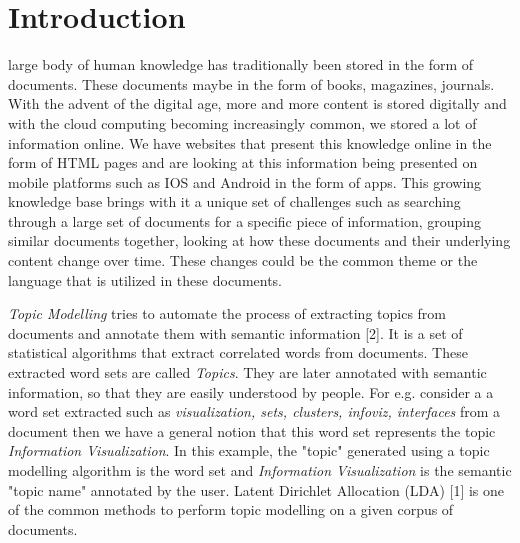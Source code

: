 \documentclass[10pt,journal,compsoc]{IEEEtran}
\begin{document}
\ifCLASSOPTIONcompsoc
{}
\else
\section{Introduction}
\label{sec:introduction}
\fi

 large body of human knowledge has traditionally been stored in the form of documents. These documents maybe in the form of books, magazines, journals. With the advent of the digital age, more and more content is stored digitally and with the cloud computing becoming increasingly common, we stored a lot of information online. We have websites that present this knowledge online in the form of HTML pages and are looking at this information being presented on mobile platforms such as IOS and Android in the form of apps. This growing knowledge base brings with it a unique set of challenges such as searching through a large set of documents for a specific piece of information, grouping similar documents together, looking at how these documents and their underlying content change over time. These changes could be the common theme or the language that is utilized in these documents.

\textit{Topic Modelling} tries to automate the process of extracting topics from documents and annotate them with semantic information [2]. It is a set of statistical algorithms that extract correlated words from documents. These extracted word sets are called \textit{Topics}. They are later annotated with semantic information, so that they are easily understood by people. For e.g. consider a a word set extracted such as \textit{visualization, sets, clusters, infoviz, interfaces} from a document then we have a general notion that this word set represents the topic \textit{Information Visualization}. In this example, the "topic" generated using a topic modelling algorithm is the word set and \textit{Information Visualization} is the semantic "topic name" annotated by the user. Latent Dirichlet Allocation (LDA) [1] is one of the common methods to perform topic modelling on a given corpus of documents.
\end{document}
